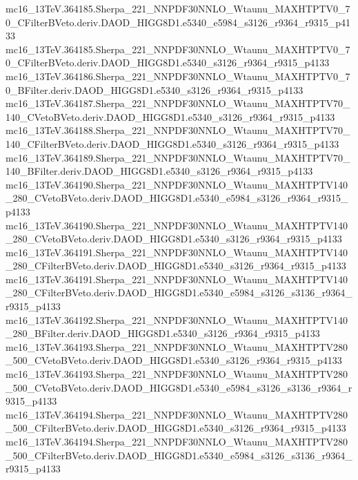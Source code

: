 \begin{scriptsize}
mc16\_13TeV.364185.Sherpa\_221\_NNPDF30NNLO\_Wtaunu\_MAXHTPTV0\_70\_CFilterBVeto.deriv.DAOD\_HIGG8D1.e5340\_e5984\_s3126\_r9364\_r9315\_p4133 \\
mc16\_13TeV.364185.Sherpa\_221\_NNPDF30NNLO\_Wtaunu\_MAXHTPTV0\_70\_CFilterBVeto.deriv.DAOD\_HIGG8D1.e5340\_s3126\_r9364\_r9315\_p4133 \\
mc16\_13TeV.364186.Sherpa\_221\_NNPDF30NNLO\_Wtaunu\_MAXHTPTV0\_70\_BFilter.deriv.DAOD\_HIGG8D1.e5340\_s3126\_r9364\_r9315\_p4133 \\
mc16\_13TeV.364187.Sherpa\_221\_NNPDF30NNLO\_Wtaunu\_MAXHTPTV70\_140\_CVetoBVeto.deriv.DAOD\_HIGG8D1.e5340\_s3126\_r9364\_r9315\_p4133 \\
mc16\_13TeV.364188.Sherpa\_221\_NNPDF30NNLO\_Wtaunu\_MAXHTPTV70\_140\_CFilterBVeto.deriv.DAOD\_HIGG8D1.e5340\_s3126\_r9364\_r9315\_p4133 \\
mc16\_13TeV.364189.Sherpa\_221\_NNPDF30NNLO\_Wtaunu\_MAXHTPTV70\_140\_BFilter.deriv.DAOD\_HIGG8D1.e5340\_s3126\_r9364\_r9315\_p4133 \\
mc16\_13TeV.364190.Sherpa\_221\_NNPDF30NNLO\_Wtaunu\_MAXHTPTV140\_280\_CVetoBVeto.deriv.DAOD\_HIGG8D1.e5340\_e5984\_s3126\_r9364\_r9315\_p4133 \\
mc16\_13TeV.364190.Sherpa\_221\_NNPDF30NNLO\_Wtaunu\_MAXHTPTV140\_280\_CVetoBVeto.deriv.DAOD\_HIGG8D1.e5340\_s3126\_r9364\_r9315\_p4133 \\
mc16\_13TeV.364191.Sherpa\_221\_NNPDF30NNLO\_Wtaunu\_MAXHTPTV140\_280\_CFilterBVeto.deriv.DAOD\_HIGG8D1.e5340\_s3126\_r9364\_r9315\_p4133 \\
mc16\_13TeV.364191.Sherpa\_221\_NNPDF30NNLO\_Wtaunu\_MAXHTPTV140\_280\_CFilterBVeto.deriv.DAOD\_HIGG8D1.e5340\_e5984\_s3126\_s3136\_r9364\_r9315\_p4133 \\
mc16\_13TeV.364192.Sherpa\_221\_NNPDF30NNLO\_Wtaunu\_MAXHTPTV140\_280\_BFilter.deriv.DAOD\_HIGG8D1.e5340\_s3126\_r9364\_r9315\_p4133 \\
mc16\_13TeV.364193.Sherpa\_221\_NNPDF30NNLO\_Wtaunu\_MAXHTPTV280\_500\_CVetoBVeto.deriv.DAOD\_HIGG8D1.e5340\_s3126\_r9364\_r9315\_p4133 \\
mc16\_13TeV.364193.Sherpa\_221\_NNPDF30NNLO\_Wtaunu\_MAXHTPTV280\_500\_CVetoBVeto.deriv.DAOD\_HIGG8D1.e5340\_e5984\_s3126\_s3136\_r9364\_r9315\_p4133 \\
mc16\_13TeV.364194.Sherpa\_221\_NNPDF30NNLO\_Wtaunu\_MAXHTPTV280\_500\_CFilterBVeto.deriv.DAOD\_HIGG8D1.e5340\_s3126\_r9364\_r9315\_p4133 \\
mc16\_13TeV.364194.Sherpa\_221\_NNPDF30NNLO\_Wtaunu\_MAXHTPTV280\_500\_CFilterBVeto.deriv.DAOD\_HIGG8D1.e5340\_e5984\_s3126\_s3136\_r9364\_r9315\_p4133 \\

\end{scriptsize}
